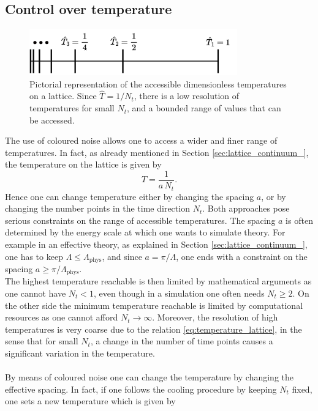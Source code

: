 \subsection{Control over temperature}
\begin{figure}
    \centering 
    \includegraphics[width=0.8\textwidth]{figures/temperatures.pdf}
    \caption[Temperatures on the lattice]{Pictorial representation of the accessible dimensionless temperatures on a lattice. Since $\hat T = 1/N_t$, there is a low resolution of temperatures for small $N_t$, and a bounded range of values that can be accessed.}
    \label{fig:temperatures_lattice}
\end{figure}
The use of coloured noise allows one to access a wider and finer range of temperatures. In fact, as already mentioned in Section \ref{sec:lattice_continuum_}, the temperature on the lattice is given by 
\begin{equation}
    T = \frac{1}{a \, N_t}.
    \label{eq:temperature_lattice}
\end{equation}
Hence one can change temperature either by changing the spacing $a$, or by changing the number points in the time direction $N_t$. 
Both approaches pose serious constraints on the range of accessible temperatures. The spacing $a$ is often determined by the energy scale at which one wants to simulate theory. 
For example in an effective theory, as explained in Section \ref{sec:lattice_continuum_}, one has to keep $\Lambda \leq \Lambda_\text{phys}$, and since $a = \pi/\Lambda$, one ends with a constraint on the spacing $a \geq \pi/\Lambda_\text{phys}$. \\
The highest temperature reachable is then limited by mathematical arguments as one cannot have $N_t < 1$, even though in a simulation one often needs $N_t \geq 2$. On the other side the minimum temperature reachable is limited by computational resources as one cannot afford $N_t \to \infty$.
Moreover, the resolution of high temperatures is very coarse due to the relation \eqref{eq:temperature_lattice}, in the sense that for small $N_t$, a change in the number of time points causes a significant variation in the temperature. \\~\\
By means of coloured noise one can change the temperature by changing the effective spacing. In fact, if one follows the cooling procedure by keeping $N_t$ fixed, one sets a new temperature which is given by 
